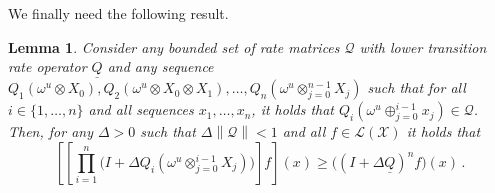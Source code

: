\documentclass[a4paper,reqno]{amsart}
\newtheorem{lemma}[theorem]{Lemma}
\newcommand{\states}{\mathcal{X}}
\newcommand{\gambles}{\mathcal{L}}
\newcommand{\gamblesX}{\gambles(\states)}
\newcommand{\lrate}{\underline{Q}}
\newcommand{\norm}[1]{\left\lVert #1 \right\rVert}
\begin{document}
We finally need the following result.
\begin{lemma}
Consider any bounded set of rate matrices $\mathcal{Q}$ with lower transition rate operator $\lrate$ and any sequence $Q_1(\omega^u\otimes X_0),Q_2(\omega^u\otimes X_0\otimes X_1),\ldots,Q_n(\omega^u\otimes_{j=0}^{n-1}X_j)$ such that for all $i\in\{1,\ldots,n\}$ and all sequences $x_1,\ldots,x_n$, it holds that $Q_i(\omega^u\oplus_{j=0}^{i-1}x_j)\in\mathcal{Q}$.
Then, for any $\Delta>0$ such that $\Delta\norm{\mathcal{Q}}<1$ and all $f\in\gamblesX$ it holds that
\begin{equation*}
\left[\left[\prod_{i=1}^n \bigl(I + \Delta Q_i(\omega^u\otimes_{j=0}^{i-1}X_j)\bigr)\right]f\right](x) \geq \bigl((I+\Delta\lrate)^n f\bigr)(x)\,.
\end{equation*}
\end{lemma}
\end{document}
